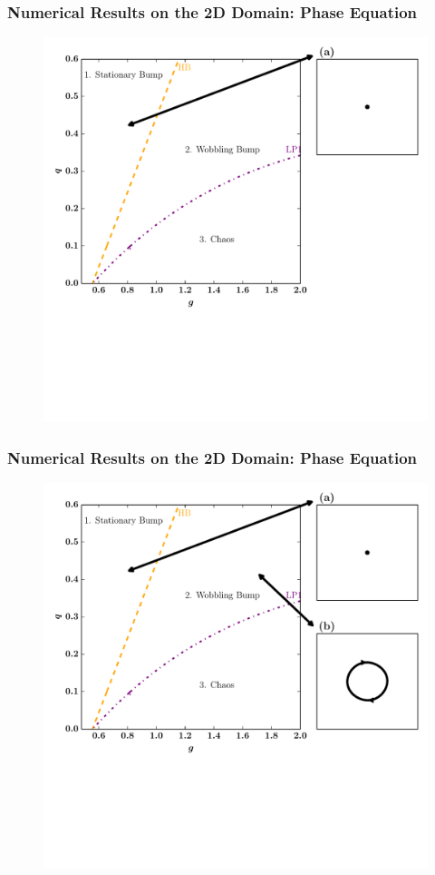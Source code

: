\documentclass{beamer}
\begin{document}
\begin{frame}
\frametitle{Numerical Results on the 2D Domain: Phase Equation}
\begin{figure}
 \includegraphics[width=.6\textwidth]{twod_phase_2par1.pdf}

\end{figure}
\end{frame}

\begin{frame}
\frametitle{Numerical Results on the 2D Domain: Phase Equation}
\begin{figure}
 \includegraphics[width=.6\textwidth]{twod_phase_2par2.pdf}

\end{figure}
\end{frame}
\end{document}
